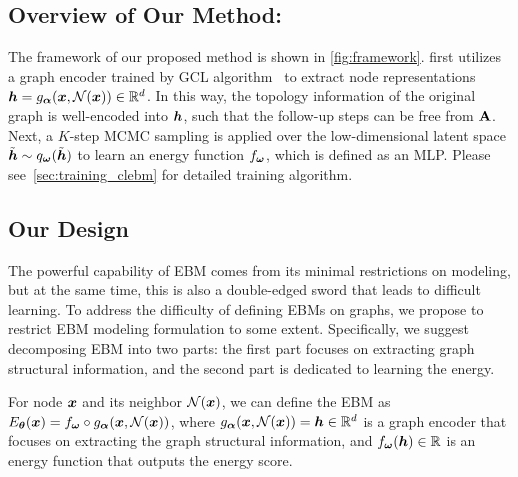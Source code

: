 \vspace{-2mm}
\subsection{Overview of Our Method: \shortname}
\vspace{-2mm}
The framework of our proposed method is shown in \cref{fig:framework}. 
\shortname first utilizes a graph encoder trained by GCL algorithm~\citep{dgi} to extract node representations ${\bm{h}} = g_{\bm{\alpha}}({\bm{x}}, \mathcal{N}({\bm{x}})) \in \mathbb{R}^{d}$. 
In this way, the topology information of the original graph is well-encoded into ${\bm{h}}$, such that the follow-up steps can be free from $\mathbf{A}$. 
Next, a $K$-step MCMC sampling is applied over the low-dimensional latent space $\Tilde{{\bm{h}}} \sim q_{{\bm{\omega}}}(\Tilde{{\bm{h}}})$ to learn an energy function $f_{{\bm{\omega}}}$, which is defined as an MLP. 
Please see~\cref{sec:training_clebm} for detailed training algorithm.

\vspace{-2mm}
\subsection{Our Design}
\vspace{-1mm}
\label{sec:our_design}
The powerful capability of EBM comes from its minimal restrictions on modeling, but at the same time, this is also a double-edged sword that leads to difficult learning. To address the difficulty of defining EBMs on graphs, we propose to restrict EBM modeling formulation to some extent. Specifically, we suggest decomposing EBM into two parts: the first part focuses on extracting graph structural information, and the second part is dedicated to learning the energy.

For node ${\bm{x}}$ and its neighbor $\mathcal{N}({\bm{x}})$, we can define the EBM as $E_{\bm{\theta}}({\bm{x}}) = f_{\bm{\omega}} \circ g_{\bm{\alpha}} ({\bm{x}},\mathcal{N}({\bm{x}}))$, 
where $g_{\bm{\alpha}}({\bm{x}},\mathcal{N}({\bm{x}})) = {\bm{h}} \in \mathbb{R}^d$ is a graph encoder that focuses on extracting the graph structural information, 
and $f_{\bm{\omega}}({\bm{h}})\in \mathbb{R}$ is an energy function that outputs the energy score. 

